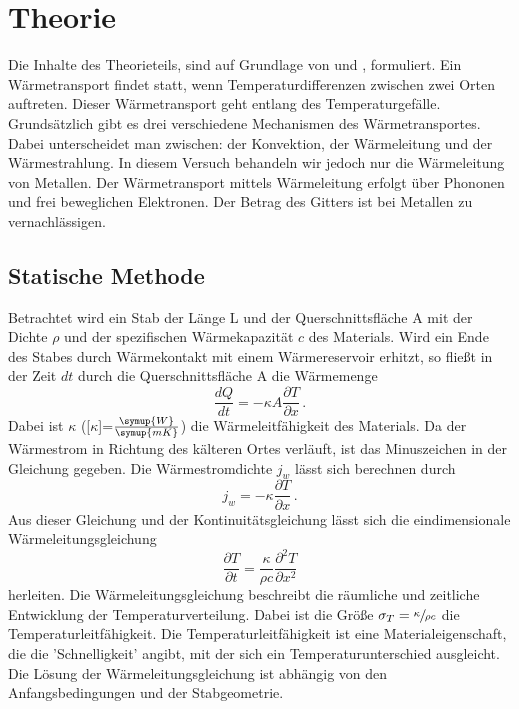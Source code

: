 \section{Theorie}
\label{sec:Theorie}
Die Inhalte des Theorieteils, sind auf Grundlage von \cite{sample} und \cite{demtröder}, formuliert.
Ein Wärmetransport findet statt, wenn Temperaturdifferenzen zwischen zwei Orten auftreten.
Dieser Wärmetransport geht entlang des Temperaturgefälle. Grundsätzlich gibt es drei verschiedene Mechanismen des Wärmetransportes.
Dabei unterscheidet man zwischen: der Konvektion, der Wärmeleitung und der Wärmestrahlung.
In diesem Versuch behandeln wir jedoch nur die Wärmeleitung von Metallen.
Der Wärmetransport mittels Wärmeleitung erfolgt über Phononen und frei beweglichen Elektronen. Der Betrag des Gitters ist bei Metallen zu vernachlässigen.
\subsection{Statische Methode}
\label{sec:stM}
Betrachtet wird ein Stab der Länge L und der Querschnittsfläche A mit der Dichte $\rho$ und der spezifischen Wärmekapazität $c$ des Materials.
Wird ein Ende des Stabes durch Wärmekontakt mit einem Wärmereservoir erhitzt, so fließt in der Zeit $dt$ durch die Querschnittsfläche A die Wärmemenge
\begin{equation}
    \frac{dQ}{dt}=-\kappa A \frac{\partial T}{\partial x} \,.
    \label{eqn:Wärmemenge}
\end{equation}
Dabei ist $\kappa$ ([$\kappa$]=$\frac{\symup{W}}{\symup{m K}}$) die Wärmeleitfähigkeit des Materials. Da der Wärmestrom 
in Richtung des kälteren Ortes verläuft, ist das Minuszeichen in der Gleichung gegeben. Die Wärmestromdichte $j_w$ lässt sich berechnen durch
\begin{equation}
    j_w=-\kappa \frac{\partial T}{\partial x}\,.
    \label{eqn:wärmedichte}
\end{equation}
Aus dieser Gleichung und der Kontinuitätsgleichung lässt sich die eindimensionale Wärmeleitungsgleichung
\begin{equation}
    \frac{\partial T}{\partial t}=\frac{\kappa}{\rho c}\frac{\partial^2 T}{\partial x^2}
    \label{eqn:Wärmeleitungsgleichung}
\end{equation}
herleiten. Die Wärmeleitungsgleichung beschreibt die räumliche und zeitliche Entwicklung der Temperaturverteilung. Dabei ist die Größe $\sigma_T=\sfrac{\kappa}{\rho c}$
die Temperaturleitfähigkeit. Die Temperaturleitfähigkeit ist eine Materialeigenschaft, die die 'Schnelligkeit' angibt, mit der sich ein Temperaturunterschied ausgleicht.
Die Lösung der Wärmeleitungsgleichung ist abhängig von den Anfangsbedingungen und der Stabgeometrie.
